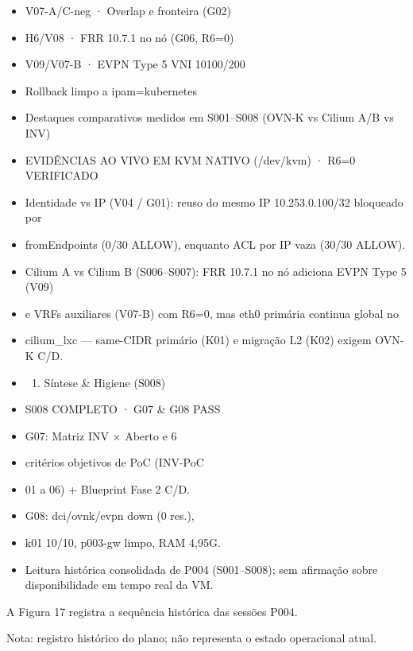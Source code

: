 \documentclass[12pt,openany,oneside,a4paper,chapter=TITLE,english,brazil]{abntex2}
\providecommand{\tightlist}{\setlength{\itemsep}{0pt}\setlength{\parskip}{0pt}}
\begin{document}
\begin{itemize}
\item
  V07-A/C-neg · Overlap e fronteira (G02)
\item
  H6/V08 · FRR 10.7.1 no nó (G06, R6=0)
\item
  V09/V07-B · EVPN Type 5 VNI 10100/200
\item
  Rollback limpo a ipam=kubernetes
\item
  Destaques comparativos medidos em S001--S008 (OVN-K vs Cilium A/B vs INV)
\item
  EVIDÊNCIAS AO VIVO EM KVM NATIVO (/dev/kvm) · R6=0 VERIFICADO
\item
  Identidade vs IP (V04 / G01): reuso do mesmo IP 10.253.0.100/32 bloqueado por
\item
  fromEndpoints (0/30 ALLOW), enquanto ACL por IP vaza (30/30 ALLOW).
\item
  Cilium A vs Cilium B (S006--S007): FRR 10.7.1 no nó adiciona EVPN Type 5 (V09)
\item
  e VRFs auxiliares (V07-B) com R6=0, mas eth0 primária continua global no
\item
  cilium\_lxc --- same-CIDR primário (K01) e migração L2 (K02) exigem OVN-K C/D.
\item
  \begin{enumerate}
  \def\labelenumi{\arabic{enumi}.}
  \setcounter{enumi}{3}
  \tightlist
  \item
    Síntese \& Higiene (S008)
  \end{enumerate}
\item
  S008 COMPLETO · G07 \& G08 PASS
\item
  G07: Matriz INV × Aberto e 6
\item
  critérios objetivos de PoC (INV-PoC
\item
  01 a 06) + Blueprint Fase 2 C/D.
\item
  G08: dci/ovnk/evpn down (0 res.),
\item
  k01 10/10, p003-gw limpo, RAM 4,95G.
\item
  Leitura histórica consolidada de P004 (S001--S008); sem afirmação sobre disponibilidade em tempo real da VM.
\end{itemize}

A Figura 17 registra a sequência histórica das sessões P004.

Nota: registro histórico do plano; não representa o estado operacional atual.
\end{document}
